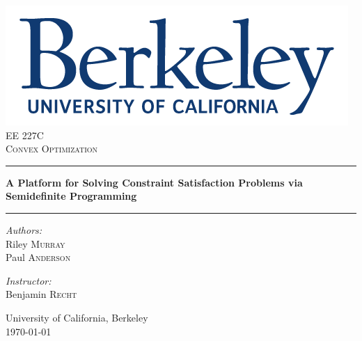 \documentclass[12pt]{article} %
\begin{document}
\begin{titlepage}
	
	\begin{center}
		\vspace{10cm}
		
		\includegraphics[width=.5\textwidth]{./images/primarylogo}\\[3cm]    
		
		\normalsize EE 227C\\
		\textsc{\large Convex Optimization}\\[1cm]		
		
		\hrule 
		\vspace{1 cm}
		{ \Large \textbf{A Platform for Solving Constraint Satisfaction Problems via Semidefinite Programming}\\[0.5cm]
			\vspace{0.5 cm}
			\hrule
			\vspace{1.5 cm}
			
			\begin{minipage}[t]{0.4\textwidth}
				\begin{flushleft} \large
					\emph{Authors:}\\
					\vspace{0.7ex}
					Riley \textsc{Murray} \\
					Paul \textsc{Anderson}
					
				\end{flushleft}
			\end{minipage}
			\begin{minipage}[t]{0.4\textwidth}
				\begin{flushright} \large
					\emph{Instructor:} \\
					\vspace{0.7ex}
					Benjamin \textsc{Recht}\\[0.3 cm]
				\end{flushright}
			\end{minipage}
			\vfill 
			University of California, Berkeley\\[.5cm]
			\large \today}
		
	\end{center}
	
\end{titlepage}
\end{document}
